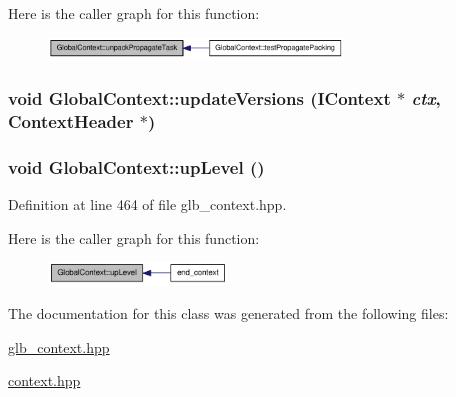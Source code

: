 Here is the caller graph for this function:\nopagebreak
\begin{figure}[H]
\begin{center}
\leavevmode
\includegraphics[width=222pt]{class_global_context_a2f62ad628b6c5d48c2cda3ea05e08860_icgraph}
\end{center}
\end{figure}
\hypertarget{class_global_context_a679f0c93603ce63c3690e578372f23b5}{
\subsubsection[{updateVersions}]{\setlength{\rightskip}{0pt plus 5cm}void GlobalContext::updateVersions ({\bf IContext} $\ast$ {\em ctx}, \/  {\bf ContextHeader} $\ast$)}}
\label{class_global_context_a679f0c93603ce63c3690e578372f23b5}
\hypertarget{class_global_context_a2afcc7411f13bee3be175887de0d5365}{
\subsubsection[{upLevel}]{\setlength{\rightskip}{0pt plus 5cm}void GlobalContext::upLevel ()}}
\label{class_global_context_a2afcc7411f13bee3be175887de0d5365}


Definition at line 464 of file glb\_\-context.hpp.

Here is the caller graph for this function:\nopagebreak
\begin{figure}[H]
\begin{center}
\leavevmode
\includegraphics[width=135pt]{class_global_context_a2afcc7411f13bee3be175887de0d5365_icgraph}
\end{center}
\end{figure}


The documentation for this class was generated from the following files:\begin{DoxyCompactItemize}
\item 
\hyperlink{glb__context_8hpp}{glb\_\-context.hpp}\item 
\hyperlink{context_8hpp}{context.hpp}\end{DoxyCompactItemize}
